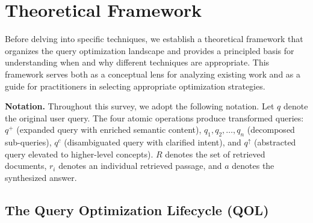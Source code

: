 \documentclass{article}
\begin{document}
\section{Theoretical Framework}\label{sec:framework}

Before delving into specific techniques, we establish a theoretical framework that organizes the query optimization landscape and provides a principled basis for understanding when and why different techniques are appropriate. This framework serves both as a conceptual lens for analyzing existing work and as a guide for practitioners in selecting appropriate optimization strategies.

\textbf{Notation.} Throughout this survey, we adopt the following notation. Let $q$ denote the original user query. The four atomic operations produce transformed queries: $q^+$ (expanded query with enriched semantic content), $q_1, q_2, \ldots, q_n$ (decomposed sub-queries), $q^c$ (disambiguated query with clarified intent), and $q^{\uparrow}$ (abstracted query elevated to higher-level concepts). $R$ denotes the set of retrieved documents, $r_i$ denotes an individual retrieved passage, and $a$ denotes the synthesized answer.

\vspace{0.3em}
\noindent{}
\vspace{0.3em}

\subsection{The Query Optimization Lifecycle (QOL)}
\end{document}
